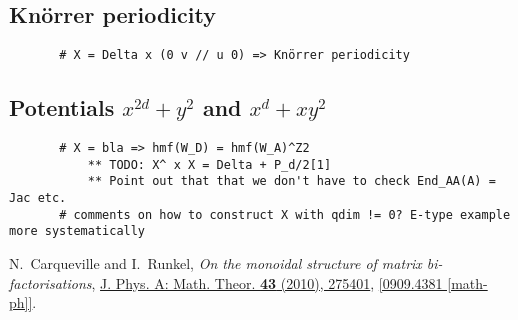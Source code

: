 \documentclass[12pt]{scrartcl}
\newcommand\arxiv[2]      {\href{http://arXiv.org/abs/#1}{#2}}
\newcommand\doi[2]        {\href{http://dx.doi.org/#1}{#2}}
\theoremstyle{definition}
\numberwithin{equation}{section}
\numberwithin{definition}{section}
\numberwithin{figure}{section}
\begin{document}
\subsection{Kn\"orrer periodicity}

\begin{verbatim}
       # X = Delta x (0 v // u 0) => Knörrer periodicity
\end{verbatim}

\subsection{Potentials $x^{2d}+y^2$ and $x^{d} + x y^2$}

\begin{verbatim}
       # X = bla => hmf(W_D) = hmf(W_A)^Z2
           ** TODO: X^ x X = Delta + P_d/2[1]
           ** Point out that that we don't have to check End_AA(A) = Jac etc.
       # comments on how to construct X with qdim != 0? E-type example more systematically
\end{verbatim}


\begin{thebibliography}{BHLS}

N.~Carqueville and I.~Runkel,
{\it On the monoidal structure of matrix bi-factorisations}, \doi{10.1088/1751-8113/43/27/275401}{J. Phys. A: Math. Theor. \textbf{43} (2010), 275401},
\arxiv{0909.4381}{[0909.4381 [math-ph]]}.


\end{thebibliography}
\end{document}
